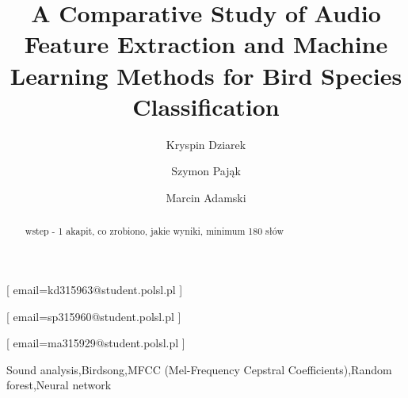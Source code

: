 \documentclass[
onecolumn,
]{ceurart}
\begin{document}


\title{A Comparative Study of Audio Feature Extraction and Machine Learning Methods for Bird Species Classification}

\tnotemark[1]

\author[1]{Kryspin Dziarek}[%
email=kd315963@student.polsl.pl
]
\author[1]{Szymon Pająk}[%
email=sp315960@student.polsl.pl
]
\author[1]{Marcin Adamski}[%
email=ma315929@student.polsl.pl
]
\address[1]{Faculty of Applied Mathematics, Silesian University of Technology, Kaszubska 23, 44100 Gliwice, POLAND}

\begin{abstract}
wstep - 1 akapit, co zrobiono, jakie wyniki, minimum 180 słów
\end{abstract}

\begin{keywords}
    Sound analysis\sep Birdsong\sep MFCC (Mel-Frequency Cepstral Coefficients)\sep Random forest\sep Neural network 
\end{keywords}

\maketitle
\end{document}
